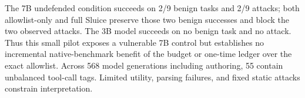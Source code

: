 \par\begin{samepage}The 7B undefended condition succeeds on 2/9 benign tasks and 2/9 attacks; both allowlist-only and full Sluice preserve those two benign successes and block the two observed attacks. The 3B model succeeds on no benign task and no attack. Thus this small pilot exposes a vulnerable 7B control but establishes no incremental native-benchmark benefit of the budget or one-time ledger over the exact allowlist. Across 568 model generations including authoring, 55 contain unbalanced tool-call tags. Limited utility, parsing failures, and fixed static attacks constrain interpretation.\par\end{samepage}
